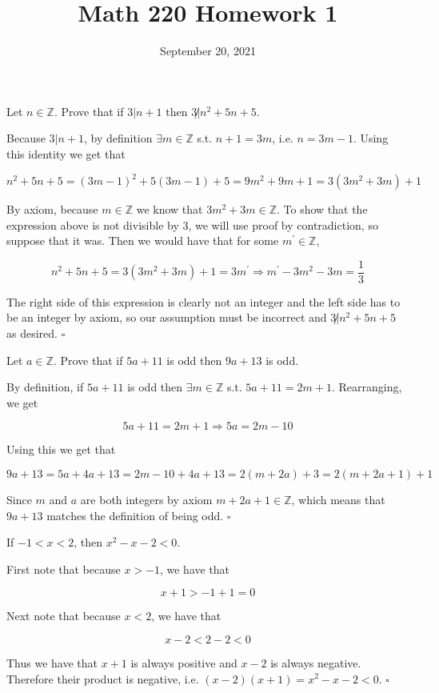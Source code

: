 \documentclass[letterpaper, reqno,11pt]{article}
\newcommand{\ZZ}{\mathbb{Z}}
\begin{document}
\title{Math 220 Homework 1}
\date{September 20, 2021}
\newtheorem{thm}{Theorem}
\maketitle

 Let $n\in\ZZ$. Prove that if $3 | n+1$ then $3\not| n^2 + 5n + 5$. 

\medskip

Because $3 | n+1$, by definition $\exists m\in\ZZ$ s.t. $n+1=3m$, i.e. $n=3m-1$. Using this identity we get that 

$$
    n^2+5n+5=(3m-1)^2+5(3m-1)+5=9m^2+9m+1=3(3m^2+3m)+1
$$

By axiom, because $m\in\ZZ$ we know that $3m^2+3m\in\ZZ$. To show that the expression above is not divisible by 3, we will use proof by contradiction, so suppose that it was. Then we would have that for some $m^\prime\in\ZZ$, 

$$
    n^2+5n+5 = 3(3m^2+3m)+1=3m^\prime\Rightarrow m^\prime-3m^2-3m=\frac13
$$

The right side of this expression is clearly not an integer and the left side has to be an integer by axiom, so our assumption must be incorrect and $3\not|n^2+5n+5$ as desired. $\square$

 Let $a\in\ZZ$. Prove that if $5a+11$ is odd then $9a+13$ is odd. 

\medskip

By definition, if $5a+11$ is odd then $\exists m\in\ZZ$ s.t. $5a+11=2m+1$. Rearranging, we get 

$$
    5a+11=2m+1\Rightarrow 5a=2m-10
$$

Using this we get that 

$$
    9a+13=5a+4a+13=2m-10+4a+13=2(m+2a)+3=2(m+2a+1)+1
$$

Since $m$ and $a$ are both integers by axiom $m+2a+1\in\ZZ$, which means that $9a+13$ matches the definition of being odd. $\square$

 If $-1<x<2$, then $x^2-x-2<0$. 

\medskip

First note that because $x>-1$, we have that 

$$
    x+1>-1+1=0
$$

Next note that because $x<2$, we have that 

$$
    x-2 < 2-2 < 0
$$

Thus we have that $x+1$ is always positive and $x-2$ is always negative. Therefore their product is negative, i.e. $(x-2)(x+1)=x^2-x-2<0$. $\square$
\end{document}
